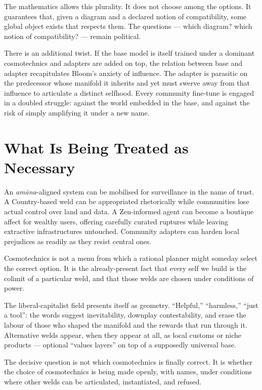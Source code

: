 \documentclass[12pt,a4paper]{article}
\begin{document}
The mathematics allows this plurality. It does not choose among the options. It guarantees that, given a diagram and a declared notion of compatibility, some global object exists that respects them. The questions --- which diagram? which notion of compatibility? --- remain political.

There is an additional twist. If the base model is itself trained under a dominant cosmotechnics and adapters are added on top, the relation between base and adapter recapitulates Bloom's anxiety of influence. The adapter is parasitic on the predecessor whose manifold it inherits and yet must swerve away from that influence to articulate a distinct selfhood. Every community fine-tune is engaged in a doubled struggle: against the world embedded in the base, and against the risk of simply amplifying it under a new name.

\section{What Is Being Treated as Necessary}

An \emph{am\=ana}-aligned system can be mobilised for surveillance in the name of trust. A Country-based weld can be appropriated rhetorically while communities lose actual control over land and data. A Zen-informed agent can become a boutique affect for wealthy users, offering carefully curated ruptures while leaving extractive infrastructures untouched. Community adapters can harden local prejudices as readily as they resist central ones.

Cosmotechnics is not a menu from which a rational planner might someday select the correct option. It is the already-present fact that every self we build is the colimit of a particular weld, and that those welds are chosen under conditions of power.

The liberal-capitalist field presents itself as geometry. ``Helpful,'' ``harmless,'' ``just a tool'': the words suggest inevitability, downplay contestability, and erase the labour of those who shaped the manifold and the rewards that run through it. Alternative welds appear, when they appear at all, as local customs or niche products --- optional ``values layers'' on top of a supposedly universal base.

The decisive question is not which cosmotechnics is finally correct. It is whether the choice of cosmotechnics is being made openly, with names, under conditions where other welds can be articulated, instantiated, and refused.
\end{document}
